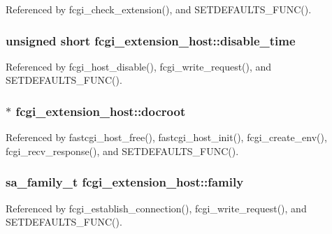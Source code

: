 Referenced by fcgi\-\_\-check\-\_\-extension(), and S\-E\-T\-D\-E\-F\-A\-U\-L\-T\-S\-\_\-\-F\-U\-N\-C().

\hypertarget{structfcgi__extension__host_ac85fe367fe7eeb221092647c6e7cec7e}{
\subsubsection[{disable\-\_\-time}]{\setlength{\rightskip}{0pt plus 5cm}unsigned short fcgi\-\_\-extension\-\_\-host\-::disable\-\_\-time}}\label{structfcgi__extension__host_ac85fe367fe7eeb221092647c6e7cec7e}


Referenced by fcgi\-\_\-host\-\_\-disable(), fcgi\-\_\-write\-\_\-request(), and S\-E\-T\-D\-E\-F\-A\-U\-L\-T\-S\-\_\-\-F\-U\-N\-C().

\hypertarget{structfcgi__extension__host_a0dcae70a69e898c98d1bc698b1887db2}{
\subsubsection[{docroot}]{$\ast$ fcgi\-\_\-extension\-\_\-host\-::docroot}}\label{structfcgi__extension__host_a0dcae70a69e898c98d1bc698b1887db2}


Referenced by fastcgi\-\_\-host\-\_\-free(), fastcgi\-\_\-host\-\_\-init(), fcgi\-\_\-create\-\_\-env(), fcgi\-\_\-recv\-\_\-response(), and S\-E\-T\-D\-E\-F\-A\-U\-L\-T\-S\-\_\-\-F\-U\-N\-C().

\hypertarget{structfcgi__extension__host_a51b5a972ef027777775dd0cc7ec24e42}{
\subsubsection[{family}]{\setlength{\rightskip}{0pt plus 5cm}sa\-\_\-family\-\_\-t fcgi\-\_\-extension\-\_\-host\-::family}}\label{structfcgi__extension__host_a51b5a972ef027777775dd0cc7ec24e42}


Referenced by fcgi\-\_\-establish\-\_\-connection(), fcgi\-\_\-write\-\_\-request(), and S\-E\-T\-D\-E\-F\-A\-U\-L\-T\-S\-\_\-\-F\-U\-N\-C().

